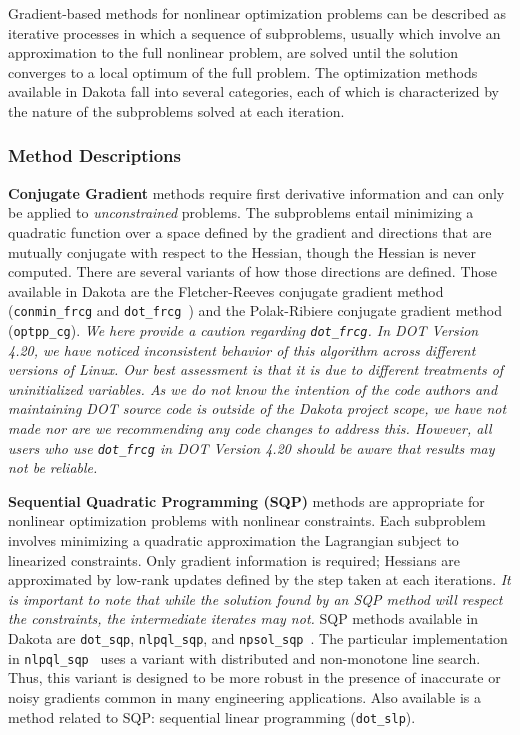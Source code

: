 Gradient-based methods for nonlinear optimization problems can be
described as iterative processes in which a sequence of subproblems,
usually which involve an approximation to the full nonlinear problem,
are solved until the solution converges to a local optimum of the full
problem.  The optimization methods available in Dakota fall into
several categories, each of which is characterized by the nature of
the subproblems solved at each iteration.

\subsubsection{Method Descriptions}
\label{opt:methods:gradient:descriptions}

{\bf Conjugate Gradient} methods require first derivative information
and can only be applied to \emph{unconstrained} problems.  The
subproblems entail minimizing a quadratic function over a space
defined by the gradient and directions that are mutually conjugate
with respect to the Hessian, though the Hessian is never computed.
There are several variants of how those directions are defined.  Those
available in Dakota are the Fletcher-Reeves conjugate gradient method
(\texttt{conmin\_frcg} and \texttt{dot\_frcg}~\cite{Van95}) and the
Polak-Ribiere conjugate gradient method (\texttt{optpp\_cg}).
\emph{We here provide a caution regarding \texttt{dot\_frcg}.  In DOT
  Version 4.20, we have noticed inconsistent behavior of this
  algorithm across different versions of Linux.  Our best assessment
  is that it is due to different treatments of uninitialized
  variables.  As we do not know the intention of the code authors and
  maintaining DOT source code is outside of the Dakota project scope,
  we have not made nor are we recommending any code changes to address
  this.  However, all users who use \texttt{dot\_frcg} in DOT Version
  4.20 should be aware that results may not be reliable.}

{\bf Sequential Quadratic Programming (SQP)} methods are appropriate
for nonlinear optimization problems with nonlinear constraints.  Each
subproblem involves minimizing a quadratic approximation the
Lagrangian subject to linearized constraints.  Only gradient
information is required; Hessians are approximated by low-rank updates
defined by the step taken at each iterations. \emph{It is important to note
that while the solution found by an SQP method will respect the
constraints, the intermediate iterates may not.}  SQP methods available
in Dakota are \texttt{dot\_sqp}, \texttt{nlpql\_sqp}, and
\texttt{npsol\_sqp}~\cite{Gil86}. The particular implementation in
\texttt{nlpql\_sqp}~\cite{Sch04} uses a variant with distributed and
non-monotone line search.  Thus, this variant is designed to be more
robust in the presence of inaccurate or noisy gradients common in many
engineering applications.  Also available is a method related to SQP:
sequential linear programming (\texttt{dot\_slp}).

